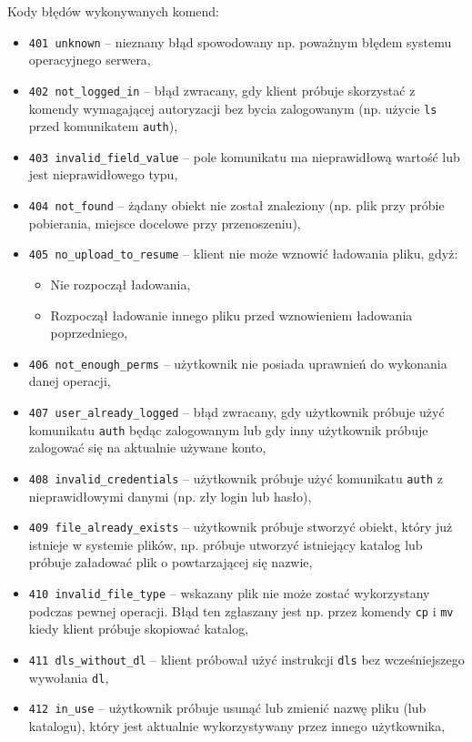 \documentclass[8pt,a4paper]{article}
\begin{document}
\noindent Kody błędów wykonywanych komend:
\begin{itemize}
    \item \texttt{401 unknown} -- nieznany błąd spowodowany np. poważnym błędem systemu operacyjnego serwera,
    \item \texttt{402 not\_logged\_in} -- błąd zwracany, gdy klient próbuje skorzystać z komendy wymagającej autoryzacji bez bycia zalogowanym (np. użycie \texttt{ls} przed komunikatem \texttt{auth}),
    \item \texttt{403 invalid\_field\_value} -- pole komunikatu ma nieprawidłową wartość lub jest nieprawidłowego typu,
    \item \texttt{404 not\_found} -- żądany obiekt nie został znaleziony (np. plik przy próbie pobierania, miejsce docelowe przy przenoszeniu),
    \item \texttt{405 no\_upload\_to\_resume} -- klient nie może wznowić ładowania pliku, gdyż:
    \begin{itemize}
        \item Nie rozpoczął ładowania,
        \item Rozpoczął ładowanie innego pliku przed wznowieniem ładowania poprzedniego,
    \end{itemize}
    \item \texttt{406 not\_enough\_perms} -- użytkownik nie posiada uprawnień do wykonania danej operacji,
    \item \texttt{407 user\_already\_logged} -- błąd zwracany, gdy użytkownik próbuje użyć komunikatu \texttt{auth} będąc zalogowanym lub gdy inny użytkownik próbuje zalogować się na aktualnie używane konto,
    \item \texttt{408 invalid\_credentials} -- użytkownik próbuje użyć komunikatu \texttt{auth} z nieprawidłowymi danymi (np. zły login lub hasło),
    \item \texttt{409 file\_already\_exists} -- użytkownik próbuje stworzyć obiekt, który już istnieje w systemie plików, np. próbuje utworzyć istniejący katalog lub próbuje załadować plik o powtarzającej się nazwie,
    \item \texttt{410 invalid\_file\_type} -- wskazany plik nie może zostać wykorzystany podczas pewnej operacji. Błąd ten zgłaszany jest np. przez komendy \texttt{cp} i \texttt{mv} kiedy klient próbuje skopiować katalog,
    \item \texttt{411 dls\_without\_dl} -- klient próbował użyć instrukcji \texttt{dls} bez wcześniejszego wywołania \texttt{dl},
    \item \texttt{412 in\_use} -- użytkownik próbuje usunąć lub zmienić nazwę pliku (lub katalogu), który jest aktualnie wykorzystywany przez innego użytkownika,

\end{itemize}
\end{document}
